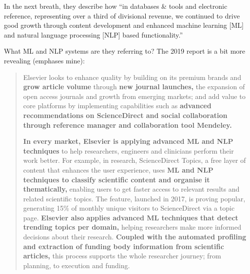 In the next breath, they describe how ``in databases \& tools and
electronic reference, representing over a third of divisional revenue, we continued to drive good growth through
content development and enhanced machine learning {[}ML{]} and natural
language processing {[}NLP{]} based functionality.''

What ML and NLP systems are they referring to? The 2019 report is a bit
more revealing (emphases mine):

\begin{quote}
Elsevier looks to enhance quality by building on its premium brands and
\textbf{grow article volume} through \textbf{new journal launches,} the
expansion of open access journals and growth from emerging markets; and
add value to core platforms by implementing capabilities such as
\textbf{advanced recommendations on ScienceDirect and social
collaboration through reference manager and collaboration tool
Mendeley.}

\textbf{In every market, Elsevier is applying advanced ML and NLP
techniques} to help researchers, engineers and clinicians perform their
work better. For example, in research, ScienceDirect Topics, a free
layer of content that enhances the user experience, uses \textbf{ML and
NLP techniques to classify scientific content and organise it
thematically,} enabling users to get faster access to relevant results
and related scientific topics. The feature, launched in 2017, is proving
popular, generating 15\% of monthly unique visitors to ScienceDirect via
a topic page. \textbf{Elsevier also applies advanced ML techniques that
detect trending topics per domain,} helping researchers make more
informed decisions about their research. \textbf{Coupled with the
automated profiling and extraction of funding body information from
scientific articles,} this process supports the whole researcher
journey; from planning, to execution and funding. \citep{RELXAnnualReport2019} 
\end{quote}

